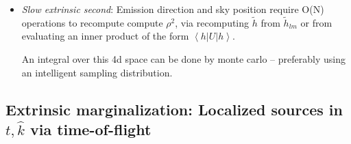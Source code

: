 \documentclass[twocolumn,prd,nofootinbib]{revtex4}
\newcommand\Y[1]{Y^{(#1)}{}}
\newcommand\qmstateproduct[2]{\left\langle#1|#2\right\rangle}
\newcommand\qmoperatorelement[3]{\left\langle#1\left|#2\right|#3\right\rangle}
\begin{document}
\begin{widetext}
{\begin{itemize}
\begin{shaded}
Since sky location and emission direction are fixed, we can preprocess and scale $Q_k$ and $P_k$ by their fixed
prefactors, generating short fiducial timeseries (only needed over the window time)
\begin{eqnarray}
\bar{Q}(t) \equiv  \sum_{k,lm}(F_k(-\hat{k}) \Y{-2}_{lm}(\hat{n}))^* Q_{k,lm}(t-\hat{k}\cdot x_k) \\
\bar{P}(t)\equiv   \sum_{klm} (F_k(-\hat{k}) \Y{-2}_{lm}(\hat{n}) ) P_{k,lm}(t-\hat{k}\cdot x_k)  \\
\ln L_{\rm data}(\lambda|t,\hat{n},\hat{k},\psi_J,d)  = (d_{\rm ref}/d)[e^{+i2\psi_J} \bar{Q}(t)  + e^{+i2\psi_J}
  \bar{Q}(t)] 
\end{eqnarray}
The computation of $\rho^2$ has the form
\begin{eqnarray}
\ln L_{\rm model}  = -\frac{(d_{\rm ref}/d)^2}{2}\left[ A  + B \cos 4(\psi-\psi_0) \right] \\
B = |\sum_k F_k F_k \qmstateproduct{{\cal I}h_{\rm ref}}{h_{\rm ref}}_k|
\end{eqnarray}
The value of $\psi_0$ is unimportant and marginalized away.  

    Given these two terms, we compute an ``easy'' integral,
where every term in the integrand can be computed from a quick interpolation over a well-sampled, low-dimensional function:
\begin{eqnarray}
L_{red,EZ} \equiv \int \frac{dt}{T_{\rm window}} \frac{d\psi}{\pi} \frac{dr}{r_{\rm max}^3/3}e^{\ln  L}
\end{eqnarray}
\end{shaded}

\item \emph{Slow extrinsic second}: Emission direction and sky position require O(N) operations to recompute compute
  $\rho^2$, via recomputing $\tilde{h}$ from $\tilde{h}_{lm}$ or from evaluating an inner product of the form
  $\qmoperatorelement{h}{U}{h}$.    

An integral over this 4d space can be done by monte carlo -- preferably using an intelligent sampling distribution.

\end{itemize}
}




\subsection{Extrinsic marginalization: Localized sources in $t,\hat{k}$ via time-of-flight }
\label{sec:sub:MarginalizeViaTimeOfFlight}


\end{widetext}
\end{document}

